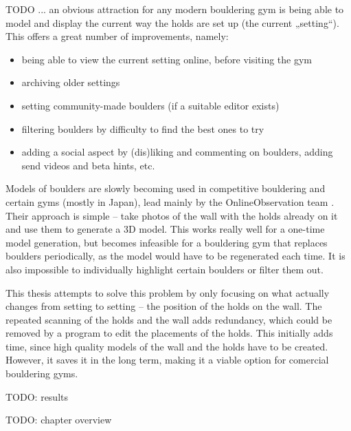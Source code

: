 

TODO ... an obvious attraction for any modern bouldering gym is being able to model and display the current way the holds are set up (the current „setting“). This offers a great number of improvements, namely:

\begin{itemize}
\item being able to view the current setting online, before visiting the gym
\item archiving older settings
\item setting community-made boulders (if a suitable editor exists)
\item filtering boulders by difficulty to find the best ones to try
\item adding a social aspect by (dis)liking and commenting on boulders, adding send videos and beta hints, etc.
\end{itemize}

Models of boulders are slowly becoming used in competitive bouldering and certain gyms (mostly in Japan), lead mainly by the OnlineObservation team \cite{onlineobservation}. Their approach is simple -- take photos of the wall with the holds already on it and use them to generate a 3D model. This works really well for a one-time model generation, but becomes infeasible for a bouldering gym that replaces boulders periodically, as the model would have to be regenerated each time. It is also impossible to individually highlight certain boulders or filter them out.

This thesis attempts to solve this problem by only focusing on what actually changes from setting to setting -- the position of the holds on the wall. The repeated scanning of the holds and the wall adds redundancy, which could be removed by a program to edit the placements of the holds. This initially adds time, since high quality models of the wall and the holds have to be created. However, it saves it in the long term, making it a viable option for comercial bouldering gyms.

TODO: results

TODO: chapter overview

